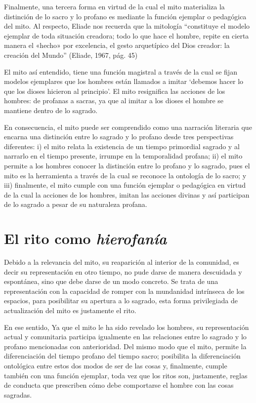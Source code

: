 \begin{refsection}
Finalmente, una tercera forma en virtud de la cual el mito materializa la distinción de lo sacro y lo profano es mediante la función ejemplar o pedagógica del mito. Al respecto, Eliade nos recuerda que la mitología ``constituye el modelo ejemplar de toda situación creadora; todo lo que hace el hombre, repite en cierta manera el «hecho» por excelencia, el gesto arquetípico del Dios creador: la creación del Mundo'' (Eliade, 1967, pág. 45)

El mito así entendido, tiene una función magistral a través de la cual se fijan modelos ejemplares que los hombres están llamados a imitar `debemos hacer lo que los dioses hicieron al principio'. El mito resignifica las acciones de los hombres: de profanas a sacras, ya que al imitar a los dioses el hombre se mantiene dentro de lo sagrado.

En consecuencia, el mito puede ser comprendido como una narración literaria que encarna una distinción entre lo sagrado y lo profano desde tres perspectivas diferentes: i) el mito relata la existencia de un tiempo primordial sagrado y al narrarlo en el tiempo presente, irrumpe en la temporalidad profana; ii) el mito permite a los hombres conocer la distinción entre lo profano y lo sagrado, pues el mito es la herramienta a través de la cual se reconoce la ontología de lo sacro; y iii) finalmente, el mito cumple con una función ejemplar o pedagógica en virtud de la cual la acciones de los hombres, imitan las acciones divinas y así participan de lo sagrado a pesar de su naturaleza profana.

\section{El rito como \emph{hierofanía} }

Debido a la relevancia del mito, su reaparición al interior de la comunidad, es decir su representación en otro tiempo, no pude darse de manera descuidada y espontánea, sino que debe darse de un modo concreto. Se trata de una representación con la capacidad de romper con la mundanidad intrínseca de los espacios, para posibilitar su apertura a lo sagrado, esta forma privilegiada de actualización del mito es justamente el rito.

En ese sentido, Ya que el mito le ha sido revelado los hombres, su representación actual y comunitaria participa igualmente en las relaciones entre lo sagrado y lo profano mencionadas con anterioridad. Del mismo modo que el mito, permite la diferenciación del tiempo profano del tiempo sacro; posibilita la diferenciación ontológica entre estos dos modos de ser de las cosas y, finalmente, cumple también con una función ejemplar, toda vez que los ritos son, justamente, reglas de conducta que prescriben cómo debe comportarse el hombre con las cosas sagradas.


\end{refsection}
